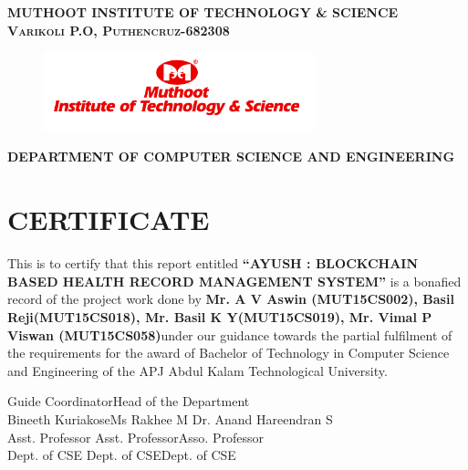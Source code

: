 \documentclass[11pt]{report}
\begin{document}
\newpage\begin{titlepage}
\center

\textsc{ \textbf{MUTHOOT INSTITUTE OF TECHNOLOGY \& SCIENCE}}\\
\textsc{\textbf{Varikoli P.O, Puthencruz-682308}}
\vspace{0.7cm}
\begin{figure}[H]
\centering
\includegraphics[width=0.7\textwidth]{logo1.png}\\

\end{figure}
\vspace{0.2cm}
\textsc{ \small \textbf{ DEPARTMENT OF COMPUTER SCIENCE AND ENGINEERING}}\\




\section*{\centering CERTIFICATE}
\begin{center}
 This is to certify that this report entitled \textbf{``AYUSH : BLOCKCHAIN BASED HEALTH RECORD MANAGEMENT SYSTEM''} is a bonafied record
of the project work done by \textbf{Mr. A V Aswin (MUT15CS002), Basil Reji(MUT15CS018), Mr. Basil K Y(MUT15CS019), Mr. Vimal P Viswan (MUT15CS058)}under our guidance towards the partial fulfilment of the requirements for the award of Bachelor of Technology in Computer Science and
Engineering of the APJ Abdul Kalam Technological University.
\end{center}
\vspace{1.6cm}

\noindent Guide \hspace{3.5cm} Coordinator\hfill Head of the Department
\\
\noindent Bineeth Kuriakose\hspace{1.62cm}Ms Rakhee M \hfill Dr. Anand Hareendran S\\
\noindent Asst. Professor\hspace{2.05cm} Asst. Professor\hfill Asso. Professor\\
\noindent Dept. of CSE\hspace{2.3cm} Dept. of CSE\hfill Dept. of CSE

\end{titlepage}
\fi
\end{document}
